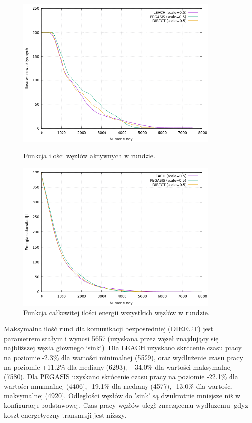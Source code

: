 \documentclass[a4paper,12pt,twoside,openany]{report}
\begin{document}
\begin{figure}[H]
 \centering
 \includegraphics[width=10cm]{images/gnuplot/test_3/nodes_in_round_xy100.png}
 \caption{Funkcja ilości węzłów aktywnych w rundzie.}
 \includegraphics[width=10cm]{images/gnuplot/test_3/energy_in_round_xy100.png}
 \caption{Funkcja całkowitej ilości energii wszystkich węzłów w rundzie.}
\end{figure}

\par
Maksymalna ilość rund dla komunikacji bezpośredniej (DIRECT) jest parametrem stałym i wynosi 5657 (uzyskana przez węzeł znajdujący się najbliższej węzła głównego `sink`).
Dla LEACH uzyskano skrócenie czasu pracy na poziomie -2.3\% dla wartości minimalnej (5529), oraz wydłużenie czasu pracy na poziomie +11.2\% dla mediany (6293), +34.0\% dla wartości maksymalnej (7580).
Dla PEGASIS uzyskano skrócenie czasu pracy na poziomie -22.1\% dla wartości minimalnej (4406), -19.1\% dla mediany (4577), -13.0\% dla wartości maksymalnej (4920).
Odległości węzłów do 'sink' są dwukrotnie mniejsze niż w konfiguracji podstawowej. Czas pracy węzłów uległ znaczącemu wydłużeniu, gdyż koszt energetyczny transmisji jest niższy.
\end{document}
